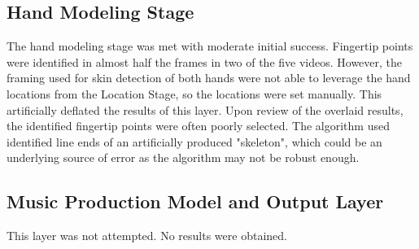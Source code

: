 \subsection{Hand Modeling Stage}
The hand modeling stage was met with moderate initial success. Fingertip points were identified in almost
half the frames in two of the five videos. However, the framing used for skin detection of both hands
were not able to leverage the hand locations from the Location Stage, so the locations were set manually.
This artificially deflated the results of this layer. Upon review of the overlaid results, the identified
fingertip points were often poorly selected. The algorithm used identified line ends of an artificially
produced "skeleton", which could be an underlying source of error as the algorithm may not be robust enough.

\subsection{Music Production Model and Output Layer}
This layer was not attempted. No results were obtained.
